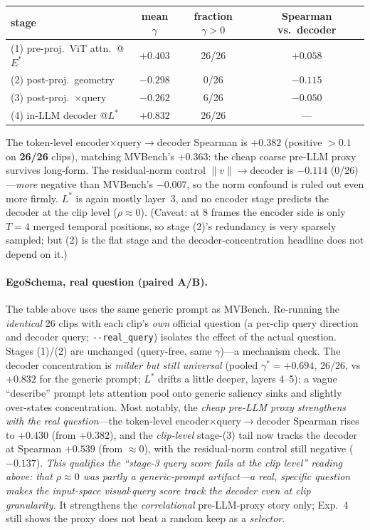 \documentclass[11pt]{article}
\newcommand{\gm}{\gamma}
\begin{document}
\begin{center}
\begin{tabular}{lccc}
\toprule
stage & mean $\gm$ & fraction $\gm>0$ & Spearman vs.\ decoder \\
\midrule
(1) pre-proj.\ ViT attn.\ @$E^{\!*}$    & $+0.403$ & 26/26 & $+0.058$ \\
(2) post-proj.\ geometry                & $-0.298$ & 0/26  & $-0.115$ \\
(3) post-proj.\ $\times$query         & $-0.262$ & 6/26  & $-0.050$ \\
(4) in-LLM decoder @$L^{\!*}$         & $+0.832$ & 26/26 & --- \\
\bottomrule
\end{tabular}
\end{center}

The token-level encoder$\times$query$\to$decoder Spearman is $\mathbf{+0.382}$ (positive
$>0.1$ on \textbf{26/26} clips), matching MVBench's $+0.363$: the cheap coarse pre-LLM
proxy survives long-form. The residual-norm control $\lVert v\rVert\to$decoder is $-0.114$
(0/26)---\emph{more} negative than MVBench's $-0.007$, so the norm confound is ruled out
even more firmly. $L^{\!*}$ is again mostly layer~3, and no encoder stage predicts the
decoder at the clip level ($\rho\approx0$). (Caveat: at 8 frames the encoder side is only
$T{=}4$ merged temporal positions, so stage (2)'s redundancy is very sparsely sampled; but
(2) is the flat stage and the decoder-concentration headline does not depend on it.)

\paragraph{EgoSchema, real question (paired A/B).} The table above uses the same generic
prompt as MVBench. Re-running the \emph{identical} 26 clips with each clip's \emph{own}
official question (a per-clip query direction and decoder query; \texttt{-{}-real\_query})
isolates the effect of the actual question. Stages (1)/(2) are unchanged (query-free, same
$\gm$)---a mechanism check. The decoder concentration is \emph{milder but still universal}
(pooled $\gm^{*}=+0.694$, 26/26, vs $+0.832$ for the generic prompt; $L^{\!*}$ drifts a
little deeper, layers 4--5): a vague ``describe'' prompt lets attention pool onto generic
saliency sinks and slightly over-states concentration. Most notably, the \emph{cheap
pre-LLM proxy strengthens with the real question}---the token-level
encoder$\times$query$\to$decoder Spearman rises to $\mathbf{+0.430}$ (from $+0.382$), and
the \emph{clip-level} stage-(3) tail now tracks the decoder at Spearman $\mathbf{+0.539}$
(from $\approx0$), with the residual-norm control still negative ($-0.137$). \emph{This
qualifies the ``stage-3 query score fails at the clip level'' reading above: that
$\rho\approx0$ was partly a generic-prompt artifact---a real, specific question makes the
input-space visual$\cdot$query score track the decoder even at clip granularity.} It
strengthens the \emph{correlational} pre-LLM-proxy story only; Exp.~4 still shows the proxy
does not beat a random keep as a \emph{selector}.
\end{document}
